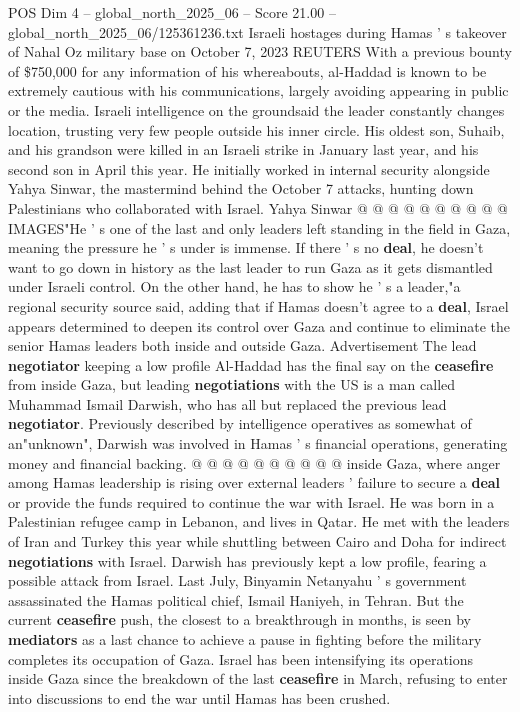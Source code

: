 \begin{textsample}{POS Dim 4 – global\_north\_2025\_06 – Score 21.00 – global\_north\_2025\_06/125361236.txt}
Israeli hostages during Hamas ' s takeover of Nahal Oz military base on October 7, 2023 REUTERS With a previous bounty of \$750,000 for any information of his whereabouts, al-Haddad is known to be extremely cautious with his communications, largely avoiding appearing in public or the media.
Israeli intelligence on the groundsaid the leader constantly changes location, trusting very few people outside his inner circle.
His oldest son, Suhaib, and his grandson were killed in an Israeli strike in January last year, and his second son in April this year.
He initially worked in internal security alongside Yahya Sinwar, the mastermind behind the October 7 attacks, hunting down Palestinians who collaborated with Israel.
Yahya Sinwar @ @ @ @ @ @ @ @ @ @ IMAGES"He ' s one of the last and only leaders left standing in the field in Gaza, meaning the pressure he ' s under is immense.
If there ' s no \textbf{deal}, he doesn't want to go down in history as the last leader to run Gaza as it gets dismantled under Israeli control.
On the other hand, he has to show he ' s a leader,"a regional security source said, adding that if Hamas doesn't agree to a \textbf{deal}, Israel appears determined to deepen its control over Gaza and continue to eliminate the senior Hamas leaders both inside and outside Gaza.
Advertisement The lead \textbf{negotiator} keeping a low profile Al-Haddad has the final say on the \textbf{ceasefire} from inside Gaza, but leading \textbf{negotiations} with the US is a man called Muhammad Ismail Darwish, who has all but replaced the previous lead \textbf{negotiator}.
Previously described by intelligence operatives as somewhat of an"unknown", Darwish was involved in Hamas ' s financial operations, generating money and financial backing. @ @ @ @ @ @ @ @ @ @ inside Gaza, where anger among Hamas leadership is rising over external leaders ' failure to secure a \textbf{deal} or provide the funds required to continue the war with Israel.
He was born in a Palestinian refugee camp in Lebanon, and lives in Qatar.
He met with the leaders of Iran and Turkey this year while shuttling between Cairo and Doha for indirect \textbf{negotiations} with Israel.
Darwish has previously kept a low profile, fearing a possible attack from Israel.
Last July, Binyamin Netanyahu ' s government assassinated the Hamas political chief, Ismail Haniyeh, in Tehran.
But the current \textbf{ceasefire} push, the closest to a breakthrough in months, is seen by \textbf{mediators} as a last chance to achieve a pause in fighting before the military completes its occupation of Gaza.
Israel has been intensifying its operations inside Gaza since the breakdown of the last \textbf{ceasefire} in March, refusing to enter into discussions to end the war until Hamas has been crushed.

\end{textsample}
